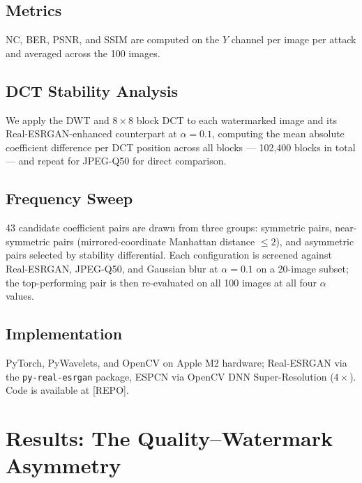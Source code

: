 \documentclass[conference]{IEEEtran}
\begin{document}
\subsection{Metrics}
NC, BER, PSNR, and SSIM \cite{ssim2004} are computed on the $Y$
channel per image per attack and averaged across the 100 images.

\subsection{DCT Stability Analysis}
We apply the DWT and $8\times8$ block DCT to each watermarked image
and its Real-ESRGAN-enhanced counterpart at $\alpha=0.1$, computing
the mean absolute coefficient difference per DCT position across all
blocks --- 102,400 blocks in total --- and repeat for JPEG-Q50 for
direct comparison.

\subsection{Frequency Sweep}
43 candidate coefficient pairs are drawn from three groups: symmetric
pairs, near-symmetric pairs (mirrored-coordinate Manhattan distance
$\leq 2$), and asymmetric pairs selected by stability differential.
Each configuration is screened against Real-ESRGAN, JPEG-Q50, and
Gaussian blur at $\alpha=0.1$ on a 20-image subset; the top-performing
pair is then re-evaluated on all 100 images at all four $\alpha$
values.

\subsection{Implementation}
PyTorch, PyWavelets, and OpenCV on Apple M2 hardware; Real-ESRGAN via
the \texttt{py-real-esrgan} package, ESPCN via OpenCV DNN
Super-Resolution ($4\times$). Code is available at [REPO].

\section{Results: The Quality--Watermark Asymmetry}
\label{sec:results}
\end{document}
